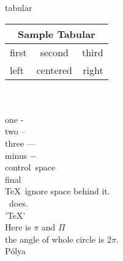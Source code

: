 tabular\\
\begin{tabular}{|l|c|r|}
  \hline
  \multicolumn{3}{|c|}{Sample Tabular}\\
  \hline
  first & second & third \\
  \cline{2-3}
  left  & centered & right \\
  \hline
\end{tabular}
\\\\
one -\\
two --\\
three ---\\
minus $ - $\\
control\ space\\
final\\
\TeX\ ignore space behind it.\\
\XeTeX\ does.\\
'\TeX'\\
Here is $\pi$ and $\Pi$\\
the angle of whole circle is 2$\pi$.\\
P\'olya\\




